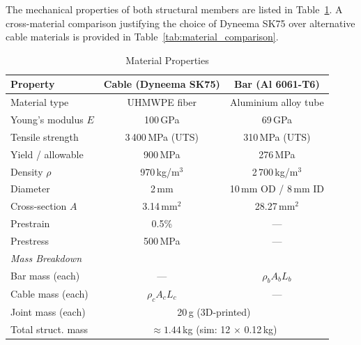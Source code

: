 \documentclass[conference]{IEEEtran}
\begin{document}
The mechanical properties of both structural members are listed in
Table~\ref{tab:materials}. A cross-material comparison justifying the choice
of Dyneema SK75 over alternative cable materials is provided in
Table~\ref{tab:material_comparison}.

\begin{table}[htbp]
\centering
\caption{Material Properties}
\label{tab:materials}
\begin{tabular}{l c c}
\hline
\textbf{Property} & \textbf{Cable (Dyneema SK75)} & \textbf{Bar (Al 6061-T6)} \\
\hline
Material type       & UHMWPE fiber            & Aluminium alloy tube \\
Young's modulus $E$ & 100\,GPa                & 69\,GPa \\
Tensile strength    & 3\,400\,MPa (UTS)       & 310\,MPa (UTS) \\
Yield / allowable   & 900\,MPa                & 276\,MPa \\
Density $\rho$      & 970\,kg/m$^3$           & 2\,700\,kg/m$^3$ \\
Diameter            & 2\,mm                   & 10\,mm OD / 8\,mm ID \\
Cross-section $A$   & 3.14\,mm$^2$            & 28.27\,mm$^2$ \\
Prestrain           & 0.5\%                   & --- \\
Prestress           & 500\,MPa                & --- \\
\hline
\multicolumn{3}{l}{\textit{Mass Breakdown}} \\
\hline
Bar mass (each)     & ---                     & $\rho_b A_b L_b$ \\
Cable mass (each)   & $\rho_c A_c L_c$        & --- \\
Joint mass (each)   & \multicolumn{2}{c}{20\,g (3D-printed)} \\
Total struct. mass  & \multicolumn{2}{c}{$\approx 1.44$\,kg (sim: 12 $\times$ 0.12\,kg)} \\
\hline
\end{tabular}
\end{table}
\end{document}
